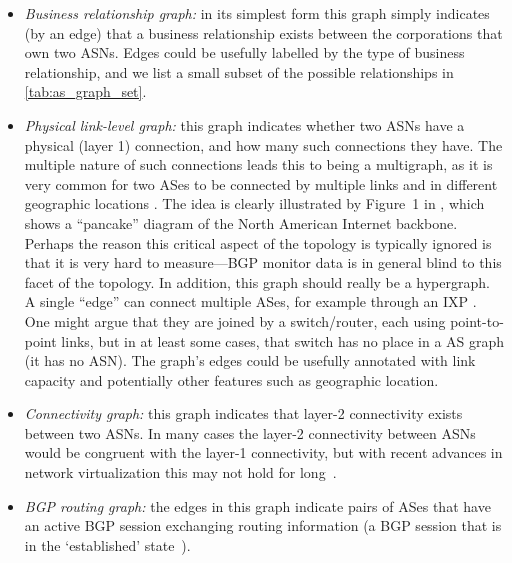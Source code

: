 \begin{itemize}

\item {\em Business relationship graph:} in its simplest form this
  graph simply indicates (by an edge) that a business relationship
  exists between the corporations that own two ASNs. Edges could be
  usefully labelled by the type of business relationship, and we list
  a small subset of the possible relationships in
  \autoref{tab:as_graph_set}.

\item {\em Physical link-level graph:} this graph indicates whether
  two ASNs have a physical (layer 1) connection, and how many such
  connections they have. The multiple nature of such connections leads
  this to being a multigraph, as it is very common for two ASes to be
  connected by multiple links and in different geographic locations
  \cite{norton_paid_peering,liljenstam03:_devel_of_inter_backb_topol,spring03:_inflation}. 
  The idea is clearly illustrated by Figure~1 in
  \cite{liljenstam03:_devel_of_inter_backb_topol}, which shows a
  ``pancake'' diagram of the North American Internet backbone. Perhaps
  the reason this critical aspect of the topology is typically ignored
  is that it is very hard to measure---BGP monitor data is in general blind
  to this facet of the topology.
  In addition, this graph should really be a hypergraph. A single
  ``edge'' can connect multiple ASes, for example through an IXP
  \cite{hyun03:_tracer_and_bgp,xu04:_ixps,augustin09:_ixps}. One might
  argue that they are joined by a switch/router, each using
  point-to-point links, but in at least some cases, that switch has no
  place in a AS graph (\ie it has no ASN).  The graph's edges could
  be usefully annotated with link capacity and potentially other
  features such as geographic location.

\item {\em Connectivity graph:} this graph indicates that layer-2
  connectivity exists between two ASNs. In many cases the layer-2
  connectivity between ASNs would be congruent with the layer-1
  connectivity, but with recent advances in network virtualization this
  may not hold for long~\cite{vroom}. 

\item {\em BGP routing graph:} the edges in this graph indicate pairs
  of ASes that have an active BGP session exchanging routing
  information (\ie a BGP session that is in the `established' state~\cite{RFC4271}).


\end{itemize}
